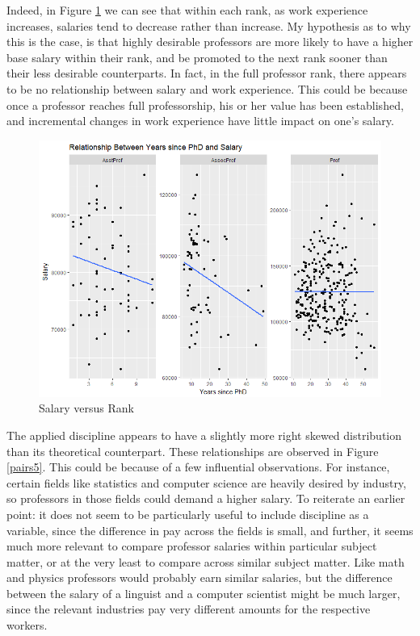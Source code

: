 \documentclass{article}
\begin{document}
Indeed, in Figure \ref{pairs4} we can see that within each rank, as work experience increases, salaries tend to decrease rather than increase. My hypothesis as to why this is the case, is that highly desirable professors are more likely to have a higher base salary within their rank, and be promoted to the next rank sooner than their less desirable counterparts. In fact, in the full professor rank, there appears to be no relationship between salary and work experience. This could be because once a professor reaches full professorship, his or her value has been established, and incremental changes in work experience have little impact on one's salary. 

\begin{figure}[!htb]
    \centering
    \includegraphics[scale=0.5]{yrsSalary}
    \caption{Salary versus Rank}
    \label{pairs4}
\end{figure}

The applied discipline appears to have a slightly more right skewed distribution than its theoretical counterpart. These relationships are observed in Figure \ref{pairs5}. This could be because of a few influential observations. For instance, certain fields like statistics and computer science are heavily desired by industry, so professors in those fields could demand a higher salary. To reiterate an earlier point: it does not seem to be particularly useful to include discipline as a variable, since the difference in pay across the fields is small, and further, it seems much more relevant to compare professor salaries within particular subject matter, or at the very least to compare across similar subject matter. Like math and physics professors would probably earn similar salaries, but the difference between the salary of a linguist and a computer scientist might be much larger, since the relevant industries pay very different amounts for the respective workers. 
\end{document}
